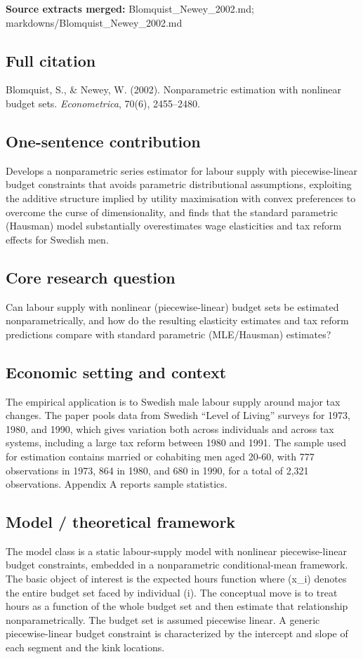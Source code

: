 \documentclass[11pt,a4paper]{article}
\begin{document}
\textbf{Source extracts merged:} Blomquist\_Newey\_2002.md; markdowns/Blomquist\_Newey\_2002.md

\subsection*{Full citation}
Blomquist, S., \& Newey, W. (2002). Nonparametric estimation with nonlinear budget sets. \textit{Econometrica}, 70(6), 2455--2480.

\subsection*{One-sentence contribution}
Develops a nonparametric series estimator for labour supply with piecewise-linear budget constraints that avoids parametric distributional assumptions, exploiting the additive structure implied by utility maximisation with convex preferences to overcome the curse of dimensionality, and finds that the standard parametric (Hausman) model substantially overestimates wage elasticities and tax reform effects for Swedish men.

\subsection*{Core research question}
Can labour supply with nonlinear (piecewise-linear) budget sets be estimated nonparametrically, and how do the resulting elasticity estimates and tax reform predictions compare with standard parametric (MLE/Hausman) estimates?

\subsection*{Economic setting and context}
The empirical application is to Swedish male labour supply around major tax changes. The paper pools data from Swedish “Level of Living” surveys for 1973, 1980, and 1990, which gives variation both across individuals and across tax systems, including a large tax reform between 1980 and 1991. The sample used for estimation contains married or cohabiting men aged 20-60, with 777 observations in 1973, 864 in 1980, and 680 in 1990, for a total of 2,321 observations. Appendix A reports sample statistics.

\subsection*{Model / theoretical framework}
The model class is a static labour-supply model with nonlinear piecewise-linear budget constraints, embedded in a nonparametric conditional-mean framework. The basic object of interest is the expected hours function where (x\_i) denotes the entire budget set faced by individual (i). The conceptual move is to treat hours as a function of the whole budget set and then estimate that relationship nonparametrically. The budget set is assumed piecewise linear. A generic piecewise-linear budget constraint is characterized by the intercept and slope of each segment and the kink locations.
\end{document}
